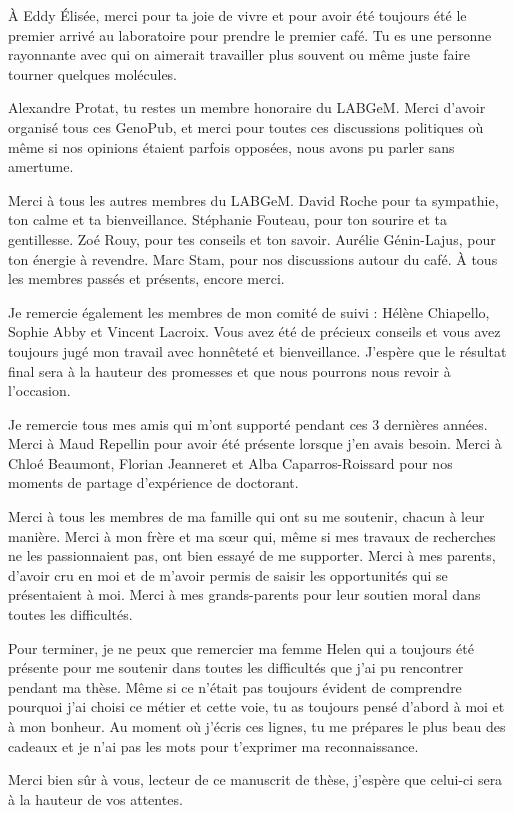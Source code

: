 À Eddy Élisée, merci pour ta joie de vivre et pour avoir été toujours été le premier arrivé au laboratoire pour prendre le premier café. Tu es une personne rayonnante avec qui on aimerait travailler plus souvent ou même juste faire tourner quelques molécules.

Alexandre Protat, tu restes un membre honoraire du LABGeM. Merci d'avoir organisé tous ces GenoPub, et merci pour toutes ces discussions politiques où même si nos opinions étaient parfois opposées, nous avons pu parler sans amertume.

Merci à tous les autres membres du LABGeM. David Roche pour ta sympathie, ton calme et ta bienveillance. Stéphanie Fouteau, pour ton sourire et ta gentillesse. Zoé Rouy, pour tes conseils et ton savoir. Aurélie Génin-Lajus, pour ton énergie à revendre. Marc Stam, pour nos discussions autour du café. À tous les membres passés et présents, encore merci.

Je remercie également les membres de mon comité de suivi : Hélène Chiapello, Sophie Abby et Vincent Lacroix. Vous avez été de précieux conseils et vous avez toujours jugé mon travail avec honnêteté et bienveillance. J'espère que le résultat final sera à la hauteur des promesses et que nous pourrons nous revoir à l'occasion.

Je remercie tous mes amis qui m'ont supporté pendant ces 3 dernières années. Merci à Maud Repellin pour avoir été présente lorsque j'en avais besoin. Merci à Chloé Beaumont, Florian Jeanneret et Alba Caparros-Roissard pour nos moments de partage d'expérience de doctorant.

Merci à tous les membres de ma famille qui ont su me soutenir, chacun à leur manière. Merci à mon frère et ma s\oe ur qui, même si mes travaux de recherches ne les passionnaient pas, ont bien essayé de me supporter. Merci à mes parents, d'avoir cru en moi et de m'avoir permis de saisir les opportunités qui se présentaient à moi. Merci à mes grands-parents pour leur soutien moral dans toutes les difficultés.

Pour terminer, je ne peux que remercier ma femme Helen qui a toujours été présente pour me soutenir dans toutes les difficultés que j'ai pu rencontrer pendant ma thèse. Même si ce n'était pas toujours évident de comprendre pourquoi j'ai choisi ce métier et cette voie, tu as toujours pensé d'abord à moi et à mon bonheur. Au moment où j'écris ces lignes, tu me prépares le plus beau des cadeaux et je n'ai pas les mots pour t'exprimer ma reconnaissance.

Merci bien sûr à vous, lecteur de ce manuscrit de thèse, j'espère que celui-ci sera à la hauteur de vos attentes.